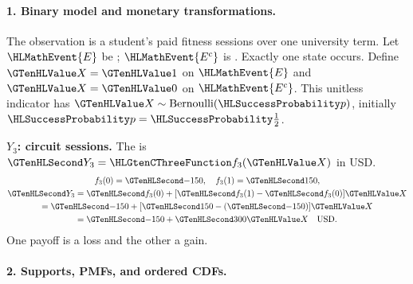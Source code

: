 \paragraph{1. Binary model and monetary transformations.}
The observation is a student's paid fitness sessions over one university term. Let $\HLMathEvent{E}$ be ; $\HLMathEvent{E^c}$ is . Exactly one state occurs. Define $\Indicator{X}=\Indicator{1}$ on $\HLMathEvent{E}$ and $\Indicator{X}=\Indicator{0}$ on $\HLMathEvent{E^c}$. This unitless indicator has $\Indicator{X}\sim\operatorname{Bernoulli}(\SuccessProb{p})$, initially $\SuccessProb{p}=\SuccessProb{\frac{1}{2}}$.
\noindent\begin{minipage}[t]{.48\linewidth}
\textbf{$Y_3$: circuit sessions.}
The  is $\Money{Y_3}=\TransformationFunction{f_3}(\Indicator{X})$ in USD.
\[
\begin{gathered}
f_3(0)=\Money{-150},\quad f_3(1)=\Money{150},\\
\Money{Y_3}=\Money{f_3(0)}+[\Money{f_3(1)}-\Money{f_3(0)}]\Indicator{X}\\
=\Money{-150}+[\Money{150}-(\Money{-150})]\Indicator{X}\\
=\Money{-150}+\Money{300}\Indicator{X}\quad\text{USD}.
\end{gathered}
\]
One payoff is a loss and the other a gain.
\end{minipage}\par
{}\paragraph{2. Supports, PMFs, and ordered CDFs.}

